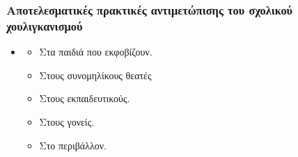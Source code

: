\documentclass[hyperref={pdfpagelabels=false}, t]{beamer}
\let\olditem=\item%
\renewcommand{\item}{\olditem \justifying}%
\begin{document}
\begin{frame}[t]
\frametitle{Αποτελεσματικές πρακτικές αντιμετώπισης του σχολικού
χουλιγκανισμού}
\vspace{-18.5pt}
\begin{adjustwidth}{-0.7cm}{}
\justifying
\begin{itemize}
  \item 
    \begin{itemize}
   \item Στα παιδιά που εκφοβίζουν. 
  \item Στους συνομηλίκους θεατές
  \item Στους εκπαιδευτικούς.  
  \item Στους γονείς.
  \item Στο περιβάλλον.
    \end{itemize}
\end{itemize}



\end{adjustwidth}
\end{frame}
\end{document}
